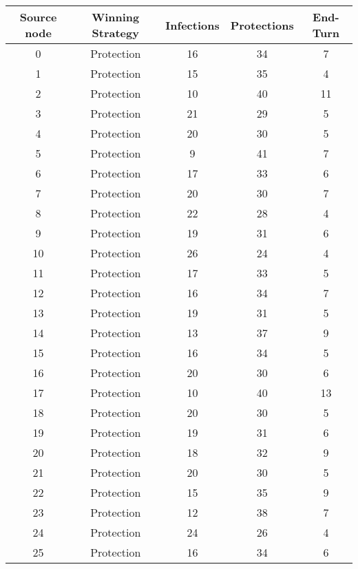 \documentclass[results.tex]{subfiles}
\begin{document}
\begin{center}
  \begin{tabular}{| c || c | c | c | c |}
    \hline
    {\bfseries Source node} & {\bfseries Winning Strategy} & {\bfseries Infections} & {\bfseries Protections} & {\bfseries End-Turn} \\  %
    \hline\hline
    0 & Protection & 16 & 34 & 7 \\ 
    \hline
    1 & Protection & 15 & 35 & 4 \\ 
    \hline
    2 & Protection & 10 & 40 & 11 \\ 
    \hline
    3 & Protection & 21 & 29 & 5 \\ 
    \hline
    4 & Protection & 20 & 30 & 5 \\ 
    \hline
    5 & Protection & 9 & 41 & 7 \\ 
    \hline
    6 & Protection & 17 & 33 & 6 \\ 
    \hline
    7 & Protection & 20 & 30 & 7 \\ 
    \hline
    8 & Protection & 22 & 28 & 4 \\ 
    \hline
    9 & Protection & 19 & 31 & 6 \\ 
    \hline
    10 & Protection & 26 & 24 & 4 \\ 
    \hline
    11 & Protection & 17 & 33 & 5 \\ 
    \hline
    12 & Protection & 16 & 34 & 7 \\ 
    \hline
    13 & Protection & 19 & 31 & 5 \\ 
    \hline
    14 & Protection & 13 & 37 & 9 \\ 
    \hline
    15 & Protection & 16 & 34 & 5 \\ 
    \hline
    16 & Protection & 20 & 30 & 6 \\ 
    \hline
    17 & Protection & 10 & 40 & 13 \\ 
    \hline
    18 & Protection & 20 & 30 & 5 \\ 
    \hline
    19 & Protection & 19 & 31 & 6 \\ 
    \hline
    20 & Protection & 18 & 32 & 9 \\ 
    \hline
    21 & Protection & 20 & 30 & 5 \\ 
    \hline
    22 & Protection & 15 & 35 & 9 \\ 
    \hline
    23 & Protection & 12 & 38 & 7 \\ 
    \hline
    24 & Protection & 24 & 26 & 4 \\ 
    \hline
    25 & Protection & 16 & 34 & 6 \\ 

\end{tabular}
\end{center}
\end{document}
